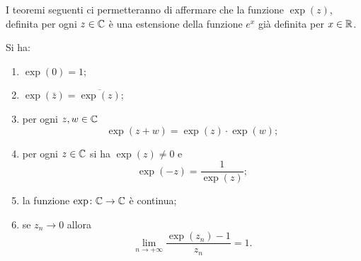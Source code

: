 I teoremi seguenti ci permetteranno di affermare che la funzione $\exp(z)$,
definita
per ogni $z\in {\mathbb C}$ è una
estensione della funzione $e^x$ già definita per $x\in {\mathbb R}$.

\begin{theorem}
\label{th:exp_complesso}%
Si ha:
\begin{enumerate}
\item
$\displaystyle \exp(0) = 1$;

\item
$\displaystyle \exp(\bar z) = \overline{\exp(z)}$;

\item
per ogni $z,w \in {\mathbb C}$
\[
  \exp(z+w) = \exp(z) \cdot \exp(w);
\]

\item
per ogni $z\in {\mathbb C}$ si ha $\exp(z) \neq 0$ e
\[
 \exp(-z) = \frac{1}{\exp(z)};
\]

\item la funzione $\exp\colon {\mathbb C} \to {\mathbb C}$ è continua;

\item se $z_n\to 0$ allora
\begin{equation}\label{eq:limite_exp_complesso}
   \lim_{n\to +\infty}\frac{\exp(z_n)-1}{z_n} = 1.
\end{equation}
\end{enumerate}
\end{theorem}
%
